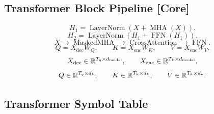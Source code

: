 \subsection{Transformer Block Pipeline \textbf{[Core]}}

\[
H_1
=
\operatorname{LayerNorm}
\left(
X+
\operatorname{MHA}(X)
\right).
\]
\[
H_2
=
\operatorname{LayerNorm}
\left(
H_1+
\operatorname{FFN}(H_1)
\right).
\]
\[
X
\to
\operatorname{MaskedMHA}
\to
\operatorname{CrossAttention}
\to
\operatorname{FFN}.
\]
\[
Q = X_{\mathrm{dec}}W_Q,
\qquad
K = X_{\mathrm{enc}}W_K,
\qquad
V = X_{\mathrm{enc}}W_V.
\]
\[
X_{\mathrm{dec}} \in \mathbb{R}^{T_q \times d_{\mathrm{model}}},
\qquad
X_{\mathrm{enc}} \in \mathbb{R}^{T_k \times d_{\mathrm{model}}}.
\]
\[
Q \in \mathbb{R}^{T_q \times d_k},
\qquad
K \in \mathbb{R}^{T_k \times d_k},
\qquad
V \in \mathbb{R}^{T_k \times d_v}.
\]

\subsection{Transformer Symbol Table}

